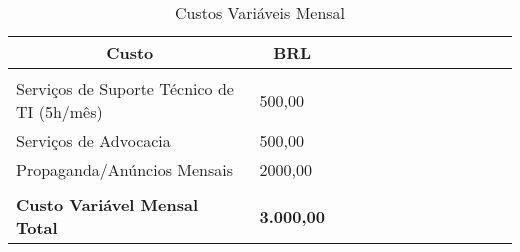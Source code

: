 \begin{enumerate}
    \begin{table}[H]
    \caption{Custos Variáveis Mensal}
    \label{custos-variaveis}
    	\centering\footnotesize
        \begin{tabular}{|p{0.50\linewidth} | p{0.11\linewidth} | p{0.2\linewidth} | p{0.35\linewidth} |}  \hline
        \multicolumn{1}{|c|}{\textbf{Custo}} &
          \multicolumn{1}{c|}{\textbf{BRL}} \\ \hline
          
                & \\ \hline

        Serviços de Suporte Técnico de TI (5h/mês) & 500,00           \\ \hline
        Serviços de Advocacia & 500,00                     \\ \hline
        Propaganda/Anúncios Mensais & 2000,00                \\\hline

        & \\ \hline
        {\textbf{Custo Variável Mensal Total}} & {\textbf{3.000,00}}\\ \hline        
        \end{tabular}
    \end{table}
\end{enumerate}
